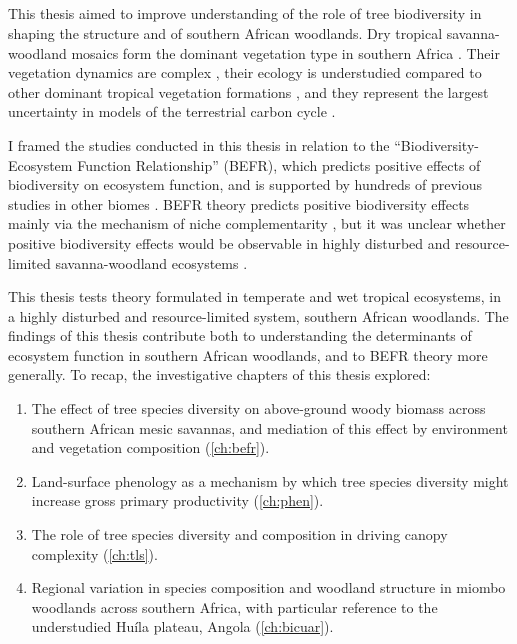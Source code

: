 \begin{refsection}


\chapter{\chaptertitle}
\label{ch:discussion}

This thesis aimed to improve understanding of the role of tree biodiversity in shaping the structure and of southern African woodlands. Dry tropical savanna-woodland mosaics form the dominant vegetation type in southern Africa \citep{Arino2010}. Their vegetation dynamics are complex \citep{Scholes1997}, their ecology is understudied compared to other dominant tropical vegetation formations \citep{Hill2010}, and they represent the largest uncertainty in models of the terrestrial carbon cycle \citep{Sitch2015, Williams2007}.

I framed the studies conducted in this thesis in relation to the ``Biodiversity-Ecosystem Function Relationship'' (BEFR), which predicts positive effects of biodiversity on ecosystem function, and is supported by hundreds of previous studies in other biomes \citep{Tilman2014, Plas2019}. BEFR theory predicts positive biodiversity effects mainly via the mechanism of niche complementarity \citep{Cardinale2009}, but it was unclear whether positive biodiversity effects would be observable in highly disturbed and resource-limited savanna-woodland ecosystems \citep{Tilman2014}. 

This thesis tests theory formulated in temperate and wet tropical ecosystems, in a highly disturbed and resource-limited system, southern African woodlands. The findings of this thesis contribute both to understanding the determinants of ecosystem function in southern African woodlands, and to BEFR theory more generally. To recap, the investigative chapters of this thesis explored: 

\begin{enumerate}
	\item{The effect of tree species diversity on above-ground woody biomass across southern African mesic savannas, and mediation of this effect by environment and vegetation composition (\autoref{ch:befr}).}
	\item{Land-surface phenology as a mechanism by which tree species diversity might increase gross primary productivity (\autoref{ch:phen}).}
	\item{The role of tree species diversity and composition in driving canopy complexity (\autoref{ch:tls}).}
	\item{Regional variation in species composition and woodland structure in miombo woodlands across southern Africa, with particular reference to the understudied Hu\'{i}la plateau, Angola (\autoref{ch:bicuar}).}
\end{enumerate}


\end{refsection}
